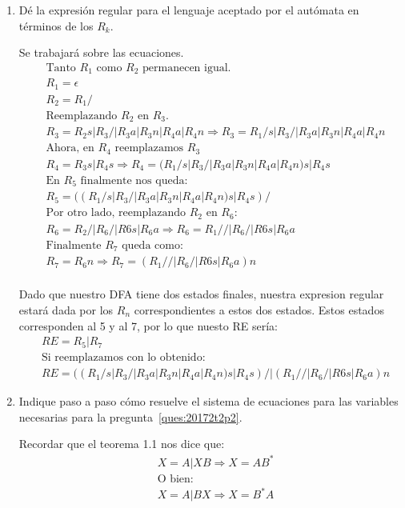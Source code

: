 \documentclass[spanish, fleqn]{article}
\begin{document}
\begin{enumerate}
  \item %
    \label{ques:20172t2p2}
    Dé la expresión regular para el lenguaje aceptado por el autómata
    en términos de los \(R_k\).
    
    Se trabajará sobre las ecuaciones.
    \begin{align*}
    &\text{Tanto $R_1$ como $R_2$ permanecen igual.}\\
    &R_{1}=\epsilon \\
    &R_{2}=R_{1}/\\
    &\text{Reemplazando $R_2$ en $R_3$.}\\
    &R_{3}=R_{2}s|R_{3}/|R_{3}a|R_{3}n|R_{4}a|R_{4}n \Rightarrow  R_{3}=R_{1}/s|R_{3}/|R_{3}a|R_{3}n|R_{4}a|R_{4}n\\
    &\text{Ahora, en $R_4$ reemplazamos $R_3$}\\
    &R_4=R_{3}s|R_{4}s \Rightarrow R_4=(R_{1}/s|R_{3}/|R_{3}a|R_{3}n|R_{4}a|R_{4}n)s|R_4s\\
    &\text{En $R_5$ finalmente nos queda:}\\
    &R_{5}=((R_{1}/s|R_{3}/|R_{3}a|R_{3}n|R_{4}a|R_{4}n)s|R_4s)/\\
    &\text{Por otro lado, reemplazando $R_2$ en $R_6$:}\\
    &R_6=R_{2}/|R_{6}/|R{6}s|R_{6}a \Rightarrow R_6=R_{1}//|R_{6}/|R{6}s|R_{6}a\\
    &\text{Finalmente $R_7$ queda como:}\\
    &R_7=R_6n \Rightarrow R_7=(R_{1}//|R_{6}/|R{6}s|R_{6}a)n\\
    \end{align*}
    
    Dado que nuestro DFA tiene dos estados finales, nuestra expresion regular estará dada por los $R_n$ correspondientes a estos
    dos estados. Estos estados corresponden al 5 y al 7, por lo que nuesto RE sería:
    \begin{align*}
	&RE=R_5 | R_7\\
    &\text{Si reemplazamos con lo obtenido:}\\
    &RE=((R_{1}/s|R_{3}/|R_{3}a|R_{3}n|R_{4}a|R_{4}n)s|R_4s)/|(R_{1}//|R_{6}/|R{6}s|R_{6}a)n
    \end{align*}
        
  \item %
    Indique paso a paso cómo resuelve el sistema de ecuaciones
    para las variables necesarias para la pregunta~\ref{ques:20172t2p2}.
	
	Recordar que el teorema 1.1 nos dice que:
	\begin{align*}
	&X = A | XB \Rightarrow X = AB^*\\
	&\text{O bien:}\\
	&X = A | BX \Rightarrow X = B^*A
	\end{align*}	    
    

\end{enumerate}
\end{document}
